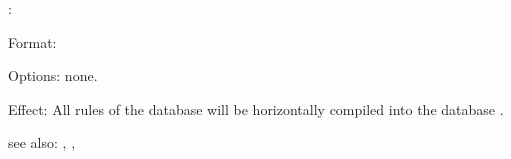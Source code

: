 :

Format: 

Options: none.

Effect:	All rules of the database  will be horizontally compiled 
	into the database .

see also: , , 

